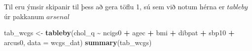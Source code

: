 \documentclass[
]{book}
\newenvironment{Shaded}{\begin{snugshade}}{\end{snugshade}}
\newcommand{\DataTypeTok}[1]{\textcolor[rgb]{0.13,0.29,0.53}{#1}}
\newcommand{\KeywordTok}[1]{\textcolor[rgb]{0.13,0.29,0.53}{\textbf{#1}}}
\newcommand{\NormalTok}[1]{#1}
\newcommand{\OperatorTok}[1]{\textcolor[rgb]{0.81,0.36,0.00}{\textbf{#1}}}
\newcommand{\StringTok}[1]{\textcolor[rgb]{0.31,0.60,0.02}{#1}}
\begin{document}
Til eru ýmsir skipanir til þess að gera töflu 1, sú sem við notum hérna er \(tableby\) úr pakkanum \(arsenal\)

\begin{Shaded}
\begin{Highlighting}[]
\NormalTok{tab\_wcgs <{-}}\StringTok{ }\KeywordTok{tableby}\NormalTok{(chol\_q }\OperatorTok{\textasciitilde{}}\StringTok{ }\NormalTok{ncigs0 }\OperatorTok{+}\StringTok{ }\NormalTok{agec }\OperatorTok{+}\StringTok{ }\NormalTok{bmi }\OperatorTok{+}\StringTok{ }\NormalTok{dibpat }\OperatorTok{+}\StringTok{ }\NormalTok{sbp10 }\OperatorTok{+}\StringTok{ }\NormalTok{arcus0, }\DataTypeTok{data =}\NormalTok{ wcgs\_dat)}
\KeywordTok{summary}\NormalTok{(tab\_wcgs)}
\end{Highlighting}
\end{Shaded}
\end{document}
